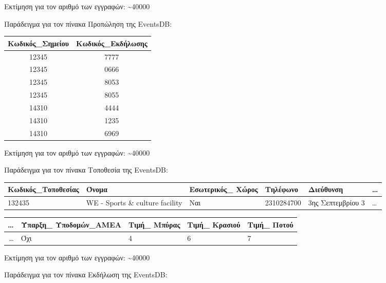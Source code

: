 Εκτίμηση για τον αριθμό των εγγραφών: \textasciitilde 40000

Παράδειγμα για τον πίνακα Προπώληση της EventsDB:

\begin{table}[H]
  \centering
  \footnotesize
  \begin{tabular}{|c|c|}
  \hline
  Κωδικός\_Σημείου & Κωδικός\_Εκδήλωσης \\ \hline
  12345 & 7777 \\ \hline
  12345 & 0666 \\ \hline
  12345 & 8053 \\ \hline
  12345 & 8055 \\ \hline
  14310 & 4444 \\ \hline
  14310 & 1235 \\ \hline
  14310 & 6969 \\ \hline
\end{tabular}
\end{table}
  
Εκτίμηση για τον αριθμό των εγγραφών: \textasciitilde 40000

Παράδειγμα για τον πίνακα Τοποθεσία της EventsDB:

\begin{table}[H]
  \centering
  \footnotesize
  \begin{tabular}{|p{1.8cm}|p{2cm}|p{1.6cm}|p{1.6cm}|p{2.5cm}|l}
  \hline
  Κωδικός\_Τοποθεσίας & Όνομα & Εσωτερικός\_ Χώρος & Τηλέφωνο & Διεύθυνση
    & \ldots \\ \hline
  132435 & WE - Sports \& culture facility & Ναι & 2310284700 & 3ης Σεπτεμβρίου 3 & \ldots \\ \hline
  \end{tabular}
  \begin{tabular}{r|p{2cm}|p{2cm}|p{2cm}|p{2cm}|}
  \hline
    \ldots & Ύπαρξη\_ Υποδομών\_ΑΜΕΑ & Τιμή\_ Μπύρας & Τιμή\_ Κρασιού
    & Τιμή\_ Ποτού \\ \hline
    \ldots & Όχι & 4 & 6 & 7 \\ \hline
\end{tabular}
\end{table}
  
Εκτίμηση για τον αριθμό των εγγραφών: \textasciitilde 40000

Παράδειγμα για τον πίνακα Εκδήλωση της EventsDB:

